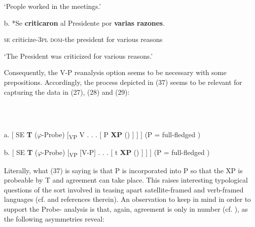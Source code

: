 \documentclass[output=paper]{langsci/langscibook}
\begin{document}
\begin{styleHTMLPreformatted}
        ‘People worked in the meetings.’
\end{styleHTMLPreformatted}

\begin{styleHTMLPreformatted}
  b. *Se   \textbf{criticaron}     al              Presidente  por \textbf{varias razones}.
\end{styleHTMLPreformatted}

\begin{styleHTMLPreformatted}
        \textsc{se}   criticize-\textsc{3pl} \textsc{dom}{}-the president      for various reasons
\end{styleHTMLPreformatted}

\begin{styleHTMLPreformatted}
         ‘The President was criticized for various reasons.’
\end{styleHTMLPreformatted}

\begin{styleHTMLPreformatted}
Consequently, the V-P reanalysis option seems to be necessary with some prepositions. Accordingly, the process depicted in (37) seems to be relevant for capturing the data in (27), (28) and (29):
\end{styleHTMLPreformatted}

\ea%
    \label{ex:key:37}
    \gll\\
        \\
    \glt
    \z

          a.   [ SE \textbf{T} ($\varphi $-Probe)  [\textsubscript{VP} V . . . [  P \textbf{XP} () ] ] ] (P = full-fledged )

 

b.   [ SE \textbf{T} ($\varphi $-Probe)  [\textsubscript{VP} [V-P] . . . [ t  \textbf{XP} () ] ] ] (P = full-fledged )

 
\begin{styleHTMLPreformatted}
Literally, what (37) is saying is that P is incorporated into P so that the XP  is probeable by T and agreement can take place. This raises interesting typological questions of the sort involved in teasing apart satellite-framed and verb-framed languages (cf. \citealt{Mateu2012} and references therein). An observation to keep in mind in order to support the Probe- analysis is that, again, agreement is only in number (cf. \citealt{Etxepare2006}), as the following asymmetries reveal:
\end{styleHTMLPreformatted}
\end{document}
